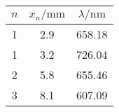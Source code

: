 \label{tab:tabwelle}
	\begin{tabular}{S[table-format=1.0]S[table-format=2.1]S[table-format=3.2]}
		\toprule
		{$n$} & {$x_n/ \si{\milli\meter}$} & {$\lambda/ \si{\nano\meter}$} \\
		 & 2.9 & 658.18 \\
		1 & 3.2 & 726.04 \\
		2 & 5.8 & 655.46 \\
		3 & 8.1 & 607.09 \\
		\bottomrule
	\end{tabular}
